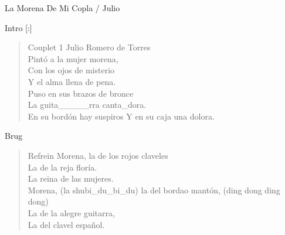 \begin{song}{La Morena De Mi Copla / Julio}

\begin{instrumental}{Intro}
\measure*{}[:]
\measure{}
\end{instrumental}

\begin{verse}{Couplet 1}
Julio Romero de Torres\\
Pintó a la mujer morena,\\
Con los ojos de misterio\chord{}\\
Y el alma llena de pena.\\
Puso en sus brazos\phantom{x}\phantom{xxx} de bronce\\
La guita\_\_\_\_\_rra canta\_dora.\\
En su bordón hay suspiros\hspace{4em}
Y en su caja una dolora.\\
\end{verse}

\begin{instrumental}{Brug}
\measure{}\measure{}\measure{}
\end{instrumental}

\begin{verse}{Refrein}
\hspace{6ex}Morena, la de los rojos claveles\\
La de la reja floría.\\
La reina de las\hspace{\wlskip} mujeres.\\
Morena, \small{(la shubi\_du\_bi\_du)} la del bordao mantón, \small{(ding dong ding dong)}\\
La de la alegre guitarra, \\
La del clavel español.
\end{verse}


\end{song}
